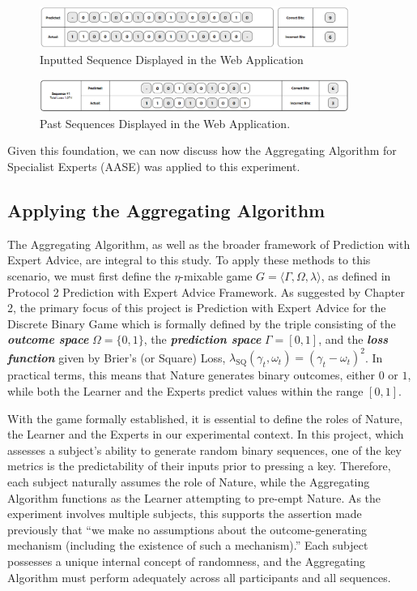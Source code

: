 \begin{figure}[h]
    \centering
    \includegraphics[width=0.9\textwidth]{images/sequence_input.png}
    \caption{Inputted Sequence Displayed in the Web Application}
\end{figure}

\begin{figure}[h]
    \centering
    \includegraphics[width=0.9\textwidth]{images/past_sequences.png}
    \caption{Past Sequences Displayed in the Web Application.}
\end{figure}

Given this foundation, we can now discuss how the Aggregating Algorithm for Specialist Experts (AASE) was applied to this experiment.

\subsection{Applying the Aggregating Algorithm}
The Aggregating Algorithm, as well as the broader framework of Prediction with Expert Advice, are integral to this study. To apply these methods to this scenario, we must first define the $\eta$-mixable game $G = \langle \Gamma, \Omega, \lambda \rangle$, as defined in Protocol 2 \textendash{} Prediction with Expert Advice Framework. As suggested by Chapter 2, the primary focus of this project is Prediction with Expert Advice for the Discrete Binary Game which is formally defined by the triple consisting of the \textbf{\textit{outcome space}} $\Omega = \{0, 1\}$, the \textbf{\textit{prediction space}} $\Gamma = [0, 1]$, and the \textbf{\textit{loss function}} given by Brier's (or Square) Loss, $\lambda_\text{SQ}(\gamma_t, \omega_t) = {(\gamma_t - \omega_t)}^2$. In practical terms, this means that Nature generates binary outcomes, either $0$ or $1$, while both the Learner and the Experts predict values within the range $[0, 1]$.

With the game formally established, it is essential to define the roles of Nature, the Learner and the Experts in our experimental context. In this project, which assesses a subject's ability to generate random binary sequences, one of the key metrics is the predictability of their inputs prior to pressing a key. Therefore, each subject naturally assumes the role of Nature, while the Aggregating Algorithm functions as the Learner attempting to pre-empt Nature. As the experiment involves multiple subjects, this supports the assertion made previously that ``we make no assumptions about the outcome-generating mechanism (including the existence of such a mechanism).'' Each subject possesses a unique internal concept of randomness, and the Aggregating Algorithm must perform adequately across all participants and all sequences.

